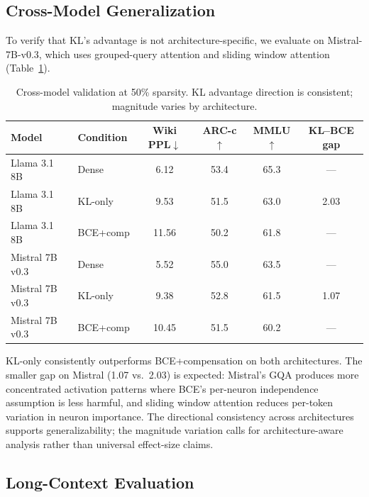\documentclass[11pt]{article}
\begin{document}
\subsection{Cross-Model Generalization}
\label{sec:mistral}

To verify that KL's advantage is not architecture-specific, we evaluate on Mistral-7B-v0.3, which uses grouped-query attention and sliding window attention (Table~\ref{tab:cross_model}).

\begin{table}[t]
\centering
\caption{Cross-model validation at 50\% sparsity. KL advantage direction is consistent; magnitude varies by architecture.}
\label{tab:cross_model}
\small
\begin{tabular}{llcccc}
\toprule
Model & Condition & Wiki PPL$\downarrow$ & ARC-c$\uparrow$ & MMLU$\uparrow$ & KL--BCE gap \\
\midrule
Llama 3.1 8B & Dense & 6.12 & 53.4 & 65.3 & --- \\
Llama 3.1 8B & KL-only & 9.53 & 51.5 & 63.0 & 2.03 \\
Llama 3.1 8B & BCE+comp & 11.56 & 50.2 & 61.8 & --- \\
\midrule
Mistral 7B v0.3 & Dense & 5.52 & 55.0 & 63.5 & --- \\
Mistral 7B v0.3 & KL-only & 9.38 & 52.8 & 61.5 & 1.07 \\
Mistral 7B v0.3 & BCE+comp & 10.45 & 51.5 & 60.2 & --- \\
\bottomrule
\end{tabular}
\end{table}

KL-only consistently outperforms BCE+compensation on both architectures. The smaller gap on Mistral (1.07 vs.\ 2.03) is expected: Mistral's GQA produces more concentrated activation patterns where BCE's per-neuron independence assumption is less harmful, and sliding window attention reduces per-token variation in neuron importance. The directional consistency across architectures supports generalizability; the magnitude variation calls for architecture-aware analysis rather than universal effect-size claims.

\subsection{Long-Context Evaluation}
\label{sec:longcontext}
\end{document}
